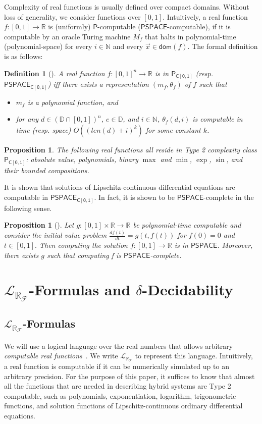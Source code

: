 \documentclass[10pt]{article}
\theoremstyle{plain}
\newtheorem{proposition}[theorem]{Proposition}
\newtheorem{definition}[theorem]{Definition}
\theoremstyle{definition}
\newcommand{\lrf}{\mathcal{L}_{\mathbb{R}_{\mathcal{F}}}}
\newcommand{\dom}{\mathsf{dom}}
\begin{document}
Complexity of real functions is usually defined over compact domains. Without loss of generality, we consider functions over $[0,1]$. Intuitively, a real function $f:[0,1]\rightarrow\mathbb{R}$ is (uniformly) $\mathsf{P}$-computable ($\mathsf{PSPACE}$-computable), if it is computable by an oracle Turing machine $M_{f}$ that halts in polynomial-time (polynomial-space) for every $i\in \mathbb{N}$ and every $\vec x\in \dom(f)$. The formal definition is as follows:
\begin{definition}[\cite{Kobook}]
A real function $f: [0,1]^n\rightarrow \mathbb{R}$ is in $\mathsf{P_{C[0,1]}}$ (resp. $\mathsf{PSPACE_{C[0,1]}}$) iff there exists a representation $(m_f, \theta_f)$ of $f$ such that
\begin{itemize}
\item $m_f$ is a polynomial function, and 
\item for any $d\in (\mathbb{D}\cap [0,1])^n$, $e\in \mathbb{D}$, and $i\in \mathbb{N}$, $\theta_f(d,i)$ is computable in time (resp. space) $O((\mathit{len}(d)+i)^k)$ for some constant $k$.
\end{itemize}
\end{definition}
\begin{proposition}
The following real functions all reside in Type 2 complexity class $\mathsf{P_{C[0,1]}}$: absolute value, polynomials, binary $\max$ and $\min$, $\exp$, $\sin$, and their bounded compositions. \end{proposition}
It is shown that solutions of Lipschitz-continuous differential equations are computable in $\mathsf{PSPACE_{C[0,1]}}$. In fact, it is shown to be $\mathsf{PSPACE}$-complete in the following sense. 
\begin{proposition}[\cite{Kawamura09}]
Let $g:[0,1]\times \mathbb{R}\rightarrow \mathbb{R}$ be polynomial-time computable and consider the initial value problem $\frac{df(t)}{dt} = g(t, f(t))$ for $f(0)=0$ and $t\in [0,1].$ Then computing the solution $f:[0,1]\rightarrow \mathbb{R}$ is in $\mathsf{PSPACE}$. Moreover, there exists $g$ such that computing f is $\mathsf{PSPACE}$-complete. 
\end{proposition}

\section{$\lrf$-Formulas and $\delta$-Decidability}

\subsection{$\lrf$-Formulas}
We will use a logical language over the real numbers that allows arbitrary {\em computable real functions}~\cite{CAbook}. We write $\lrf$ to represent this language. Intuitively, a real function is computable if it can be numerically simulated up to an arbitrary precision. For the purpose of this paper, it suffices to know that almost all the functions that are needed in describing hybrid systems are Type 2 computable, such as polynomials, exponentiation, logarithm, trigonometric functions, and solution functions of Lipschitz-continuous ordinary differential equations.
\end{document}

